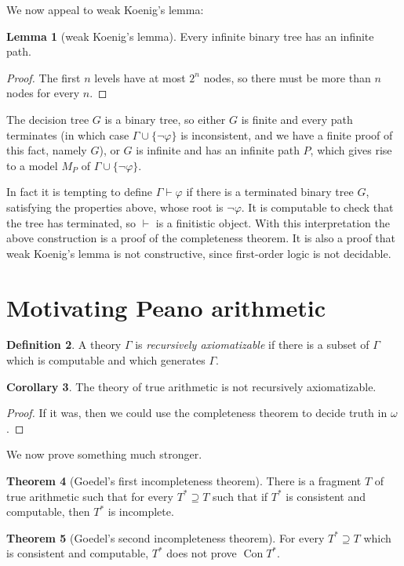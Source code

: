 \documentclass[12pt]{report}
\newcommand{\proves}{\vdash}
\DeclareMathOperator{\Con}{Con}
\newcommand{\dfn}[1]{\emph{#1}\index{#1}}
\theoremstyle{definition}
\newtheorem{theorem}{Theorem}[chapter]
\newtheorem{lemma}[theorem]{Lemma}
\newtheorem{corollary}[theorem]{Corollary}
\newtheorem{definition}[theorem]{Definition}
\begin{document}
We now appeal to weak Koenig's lemma:
\begin{lemma}[weak Koenig's lemma]
Every infinite binary tree has an infinite path.
\end{lemma}
\begin{proof}
The first $n$ levels have at most $2^n$ nodes, so there must be more than $n$ nodes for every $n$.
\end{proof}
The decision tree $G$ is a binary tree, so either $G$ is finite and every path terminates (in which case $\Gamma \cup \{\neg\varphi\}$ is inconsistent, and we have a finite proof of this fact, namely $G$), or $G$ is infinite and has an infinite path $P$, which gives rise to a model $M_P$ of $\Gamma \cup \{\neg\varphi\}$.

In fact it is tempting to define $\Gamma \proves \varphi$ if there is a terminated binary tree $G$, satisfying the properties above, whose root is $\neg\varphi$. It is computable to check that the tree has terminated, so $\proves$ is a finitistic object. With this interpretation the above construction is a proof of the completeness theorem. It is also a proof that weak Koenig's lemma is not constructive, since first-order logic is not decidable.

\section{Motivating Peano arithmetic}
\begin{definition}
A theory $\Gamma$ is \dfn{recursively axiomatizable} if there is a subset of $\Gamma$ which is computable and which generates $\Gamma$.
\end{definition}
\begin{corollary}
The theory of true arithmetic is not recursively axiomatizable.
\end{corollary}
\begin{proof}
If it was, then we could use the completeness theorem to decide truth in $\omega$.
\end{proof}
We now prove something much stronger.
\begin{theorem}[Goedel's first incompleteness theorem]
There is a fragment $T$ of true arithmetic such that for every $T^* \supseteq T$ such that if $T^*$ is consistent and computable, then $T^*$ is incomplete.
\end{theorem}
\begin{theorem}[Goedel's second incompleteness theorem]
For every $T^* \supseteq T$ which is consistent and computable, $T^*$ does not prove $\Con T^*$.
\end{theorem}
\end{document}
